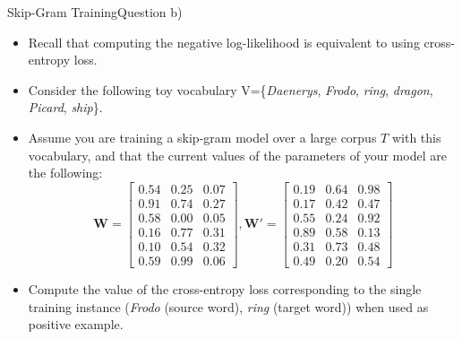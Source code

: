 \documentclass[t]{beamer}
\begin{document}
\begin{frame}{Skip-Gram Training}{Question b)}
    \begin{itemize}
        \item Recall that computing the negative log-likelihood is equivalent to
              using cross-entropy loss.
        \item Consider the following toy vocabulary
              V=\{\textit{Daenerys}, \textit{Frodo}, \textit{ring}, \textit{dragon}, \textit{Picard}, \textit{ship}\}.
        \item Assume you are training a skip-gram model over a large corpus $T$
              with this vocabulary, and that the current values of the
              parameters of your model are the following:
              \[
                  \mathbf{W}=
                  \begin{bmatrix}
                      0.54 & 0.25 & 0.07 \\
                      0.91 & 0.74 & 0.27 \\
                      0.58 & 0.00 & 0.05 \\
                      0.16 & 0.77 & 0.31 \\
                      0.10 & 0.54 & 0.32 \\
                      0.59 & 0.99 & 0.06
                  \end{bmatrix},
                  \mathbf{W'}=
                  \begin{bmatrix}
                      0.19 & 0.64 & 0.98 \\
                      0.17 & 0.42 & 0.47 \\
                      0.55 & 0.24 & 0.92 \\
                      0.89 & 0.58 & 0.13 \\
                      0.31 & 0.73 & 0.48 \\
                      0.49 & 0.20 & 0.54
                  \end{bmatrix}
              \]
        \item Compute the value of the cross-entropy loss corresponding to the
              single training instance (\textit{Frodo} (source word),
              \textit{ring} (target word)) when used as positive example.
    \end{itemize}
\end{frame}
\end{document}
